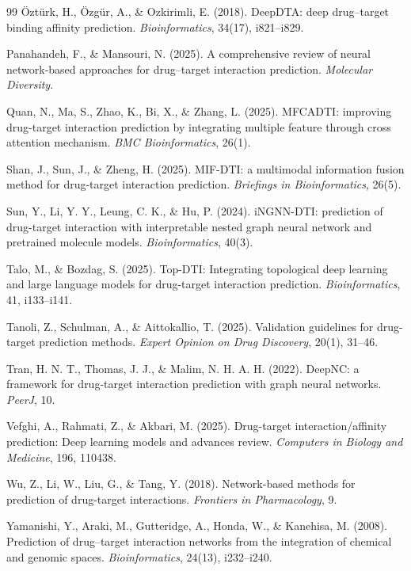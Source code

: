 \documentclass[12pt,a4paper,oneside]{report}
\begin{document}
\begin{thebibliography}{99}
Öztürk, H., Özgür, A., \& Ozkirimli, E. (2018).
DeepDTA: deep drug–target binding affinity prediction.
\textit{Bioinformatics}, 34(17), i821--i829.

Panahandeh, F., \& Mansouri, N. (2025).
A comprehensive review of neural network-based approaches for drug–target interaction prediction.
\textit{Molecular Diversity}.

Quan, N., Ma, S., Zhao, K., Bi, X., \& Zhang, L. (2025).
MFCADTI: improving drug-target interaction prediction by integrating multiple feature through cross attention mechanism.
\textit{BMC Bioinformatics}, 26(1).

Shan, J., Sun, J., \& Zheng, H. (2025).
MIF-DTI: a multimodal information fusion method for drug-target interaction prediction.
\textit{Briefings in Bioinformatics}, 26(5).

Sun, Y., Li, Y. Y., Leung, C. K., \& Hu, P. (2024).
iNGNN-DTI: prediction of drug-target interaction with interpretable nested graph neural network and pretrained molecule models.
\textit{Bioinformatics}, 40(3).

Talo, M., \& Bozdag, S. (2025).
Top-DTI: Integrating topological deep learning and large language models for drug-target interaction prediction.
\textit{Bioinformatics}, 41, i133--i141.

Tanoli, Z., Schulman, A., \& Aittokallio, T. (2025).
Validation guidelines for drug-target prediction methods.
\textit{Expert Opinion on Drug Discovery}, 20(1), 31--46.

Tran, H. N. T., Thomas, J. J., \& Malim, N. H. A. H. (2022).
DeepNC: a framework for drug-target interaction prediction with graph neural networks.
\textit{PeerJ}, 10.

Vefghi, A., Rahmati, Z., \& Akbari, M. (2025).
Drug-target interaction/affinity prediction: Deep learning models and advances review.
\textit{Computers in Biology and Medicine}, 196, 110438.

Wu, Z., Li, W., Liu, G., \& Tang, Y. (2018).
Network-based methods for prediction of drug-target interactions.
\textit{Frontiers in Pharmacology}, 9.

Yamanishi, Y., Araki, M., Gutteridge, A., Honda, W., \& Kanehisa, M. (2008).
Prediction of drug–target interaction networks from the integration of chemical and genomic spaces.
\textit{Bioinformatics}, 24(13), i232--i240.


\end{thebibliography}
\end{document}
